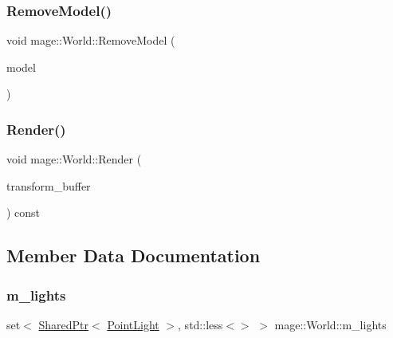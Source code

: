 \subsubsection{\texorpdfstring{Remove\+Model()}{RemoveModel()}\hspace{0.1cm}{\footnotesize\ttfamily [2/2]}}
{\footnotesize\ttfamily void mage\+::\+World\+::\+Remove\+Model (\begin{DoxyParamCaption}\item[{\hyperlink{namespacemage_a1e01ae66713838a7a67d30e44c67703e}{Shared\+Ptr}$<$ \hyperlink{classmage_1_1_model}{Model} $>$}]{model }\end{DoxyParamCaption})}

\hypertarget{classmage_1_1_world_a33da6ffdf89b78602e150101a9a38205}{}\label{classmage_1_1_world_a33da6ffdf89b78602e150101a9a38205} 
\subsubsection{\texorpdfstring{Render()}{Render()}}
{\footnotesize\ttfamily void mage\+::\+World\+::\+Render (\begin{DoxyParamCaption}\item[{const \hyperlink{structmage_1_1_transform_buffer}{Transform\+Buffer} \&}]{transform\+\_\+buffer }\end{DoxyParamCaption}) const}



\subsection{Member Data Documentation}
\hypertarget{classmage_1_1_world_acb9bceb4598a9d572f026cb65d850de5}{}\label{classmage_1_1_world_acb9bceb4598a9d572f026cb65d850de5} 
\subsubsection{\texorpdfstring{m\+\_\+lights}{m\_lights}}
{\footnotesize\ttfamily set$<$ \hyperlink{namespacemage_a1e01ae66713838a7a67d30e44c67703e}{Shared\+Ptr}$<$ \hyperlink{classmage_1_1_point_light}{Point\+Light} $>$, std\+::less$<$$>$ $>$ mage\+::\+World\+::m\+\_\+lights\hspace{0.3cm}{\ttfamily [private]}}

